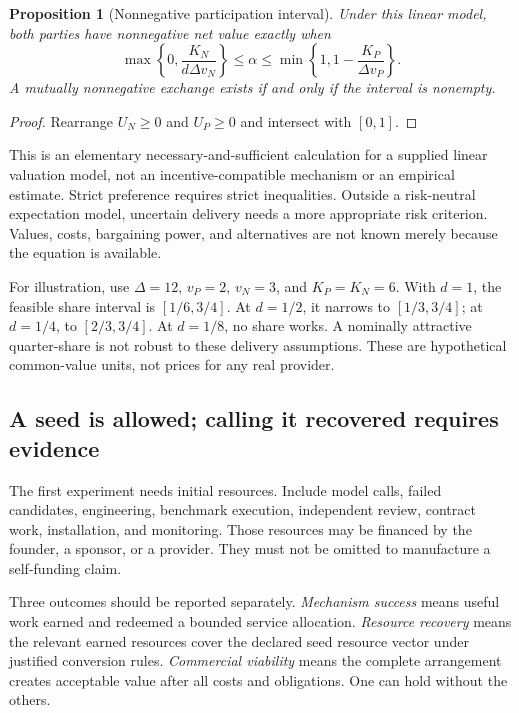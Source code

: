 \documentclass[11pt,letterpaper]{article}
\newtheorem{proposition}{Proposition}[section]
\theoremstyle{remark}\newtheorem{remark}{Remark}[section]
\begin{document}
\begin{proposition}[Nonnegative participation interval]\label{prop:participation}
Under this linear model, both parties have nonnegative net value exactly when
\begin{equation}\label{eq:interval}
\max\left\{0,\frac{K_N}{d\Delta v_N}\right\}
\le\alpha\le
\min\left\{1,1-\frac{K_P}{\Delta v_P}\right\}.
\end{equation}
A mutually nonnegative exchange exists if and only if the interval is nonempty.
\end{proposition}
\begin{proof}
Rearrange $U_N\ge0$ and $U_P\ge0$ and intersect with $[0,1]$.
\end{proof}

This is an elementary necessary-and-sufficient calculation for a supplied linear valuation model, not an incentive-compatible mechanism or an empirical estimate. Strict preference requires strict inequalities. Outside a risk-neutral expectation model, uncertain delivery needs a more appropriate risk criterion. Values, costs, bargaining power, and alternatives are not known merely because the equation is available.

For illustration, use $\Delta=12$, $v_P=2$, $v_N=3$, and $K_P=K_N=6$. With $d=1$, the feasible share interval is $[1/6,3/4]$. At $d=1/2$, it narrows to $[1/3,3/4]$; at $d=1/4$, to $[2/3,3/4]$. At $d=1/8$, no share works. A nominally attractive quarter-share is not robust to these delivery assumptions. These are hypothetical common-value units, not prices for any real provider.

\subsection{A seed is allowed; calling it recovered requires evidence}
The first experiment needs initial resources. Include model calls, failed candidates, engineering, benchmark execution, independent review, contract work, installation, and monitoring. Those resources may be financed by the founder, a sponsor, or a provider. They must not be omitted to manufacture a self-funding claim.

Three outcomes should be reported separately. \emph{Mechanism success} means useful work earned and redeemed a bounded service allocation. \emph{Resource recovery} means the relevant earned resources cover the declared seed resource vector under justified conversion rules. \emph{Commercial viability} means the complete arrangement creates acceptable value after all costs and obligations. One can hold without the others.
\end{document}
